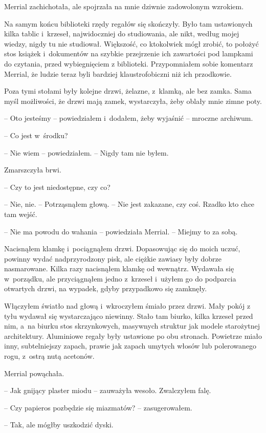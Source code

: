 \documentclass[oneside,polish,11pt,sfheadings]{mwbk}
\begin{document}
Merrial zachichotała, ale spojrzała na mnie dziwnie zadowolonym
wzrokiem.

Na samym końcu biblioteki rzędy regałów się skończyły. Było tam
ustawionych kilka tablic i~krzeseł, najwidoczniej do studiowania, ale
nikt, według mojej wiedzy, nigdy tu nie studiował. Większość, co
ktokolwiek mógł zrobić, to położyć stos książek i~dokumentów na szybkie
przejrzenie ich zawartości pod lampkami do czytania, przed wybiegnięciem
z biblioteki. Przypomniałem sobie komentarz Merrial, że ludzie teraz
byli bardziej klaustrofobiczni niż ich przodkowie.

Poza tymi stołami były kolejne drzwi, żelazne, z~klamką, ale bez zamka.
Sama myśl możliwości, że drzwi mają zamek, wystarczyła, żeby oblały mnie
zimne poty.

-- Oto jesteśmy -- powiedziałem i~dodałem, żeby wyjaśnić -- mroczne
archiwum.

-- Co jest w~środku?

-- Nie wiem -- powiedziałem. -- Nigdy tam nie byłem.

Zmarszczyła brwi. 

-- Czy to jest niedostępne, czy co?

-- Nie, nie. -- Potrząsnąłem głową. -- Nie jest zakazane, czy coś. Rzadko
kto chce tam wejść.

-- Nie ma powodu do wahania -- powiedziała Merrial. -- Miejmy to za sobą.

Nacisnąłem klamkę i~pociągnąłem drzwi. Dopasowując się do moich uczuć,
powinny wydać nadprzyrodzony pisk, ale ciężkie zawiasy były dobrze
nasmarowane. Kilka razy nacisnąłem klamkę od wewnątrz. Wydawała się w~porządku, ale przyciągnąłem jedno z~krzeseł i~użyłem go do podparcia
otwartych drzwi, na wypadek, gdyby przypadkowo się zamknęły.

Włączyłem światło nad głową i~wkroczyłem śmiało przez drzwi. Mały pokój
z tyłu wydawał się wystarczająco niewinny. Stało tam biurko, kilka
krzeseł przed nim, a~na biurku stos skrzynkowych, masywnych struktur jak
modele starożytnej architektury. Aluminiowe regały były ustawione po obu
stronach. Powietrze miało inny, subtelniejszy zapach, prawie jak zapach
umytych włosów lub polerowanego rogu, z~ostrą nutą acetonów.

Merrial powąchała. 

-- Jak gnijący plaster miodu -- zauważyła wesoło.
Zwalczyłem falę.

-- Czy papieros pozbędzie się miazmatów? -- zasugerowałem.

-- Tak, ale mógłby uszkodzić dyski.
\end{document}
